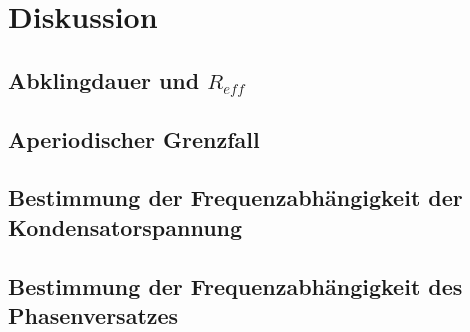 \section{Diskussion}
\label{sec:Diskussion}


\subsection{Abklingdauer und $R_{eff}$}
\label{subsec:diskussion5a}

\subsection{Aperiodischer Grenzfall}
\label{subsec:diskussion5b}

\subsection{Bestimmung der Frequenzabhängigkeit der Kondensatorspannung}
\label{subsec:diskussion5c}

\subsection{Bestimmung der Frequenzabhängigkeit des Phasenversatzes}
\label{subsec:diskussion5d}